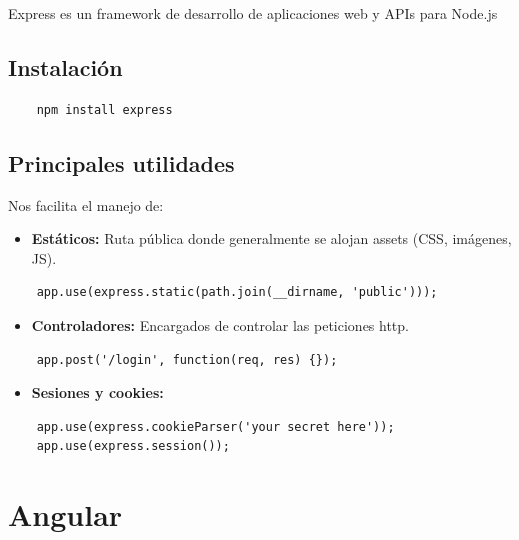 \documentclass[openright,twoside,10pt]{book}
\providecommand{\tightlist}{%
  \setlength{\itemsep}{0pt}\setlength{\parskip}{0pt}}
\begin{document}
    Express es un framework de desarrollo de aplicaciones web y APIs para
    Node.js
    
    \subsection{Instalación}\label{instalaciuxf3n-2}
    
    \begin{verbatim}
    npm install express
    \end{verbatim}
    
    \subsection{Principales utilidades}\label{principales-utilidades}
    
    Nos facilita el manejo de:
    
    \begin{itemize}
    \tightlist
    \item
      \textbf{Estáticos:} Ruta pública donde generalmente se alojan assets
      (CSS, imágenes, JS).
    \end{itemize}
    
    \begin{verbatim}
    app.use(express.static(path.join(__dirname, 'public')));
    \end{verbatim}
    
    \begin{itemize}
    \tightlist
    \item
      \textbf{Controladores:} Encargados de controlar las peticiones http.
    \end{itemize}
    
    \begin{verbatim}
    app.post('/login', function(req, res) {});
    \end{verbatim}
    
    \begin{itemize}
    \tightlist
    \item
      \textbf{Sesiones y cookies:}
    \end{itemize}
    
    \begin{verbatim}
    app.use(express.cookieParser('your secret here'));
    app.use(express.session());
    \end{verbatim}
    
    \section{Angular}\label{angular}
    
\end{document}
